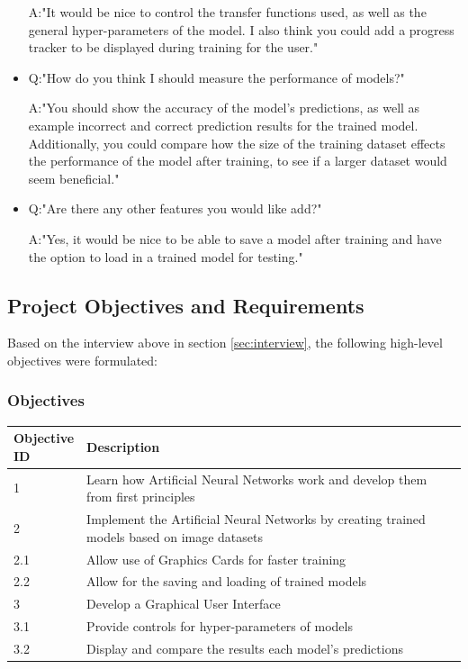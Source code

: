 \documentclass[./project-report/src/latex/project-report.tex]{subfiles}
\begin{document}
\begin{itemize}
          A:"It would be nice to control the transfer functions used, as well as the general hyper-parameters of the model. I also think you could add a progress tracker 
             to be displayed during training for the user."
    \item Q:"How do you think I should measure the performance of models?"

          A:"You should show the accuracy of the model's predictions, as well as example incorrect and correct prediction results for the trained model. Additionally, 
             you could compare how the size of the training dataset effects the performance of the model after training, to see if a larger dataset would seem 
             beneficial."
    \item Q:"Are there any other features you would like add?"

          A:"Yes, it would be nice to be able to save a model after training and have the option to load in a trained model for testing."
\end{itemize}

\subsection{Project Objectives and Requirements}

Based on the interview above in section \ref{sec:interview}, the following high-level objectives were formulated:

\subsubsection{Objectives}

\begin{tabular}{|p{0.13\linewidth}|p{0.87\linewidth}|}
      \hline
      \textbf{Objective ID} & \textbf{Description} \\
      \hline
      1 & Learn how Artificial Neural Networks work and develop them from first principles \\
      \hline
      2 & Implement the Artificial Neural Networks by creating trained models based on image datasets \\
      \hline
      2.1 & Allow use of Graphics Cards for faster training \\
      \hline
      2.2 & Allow for the saving and loading of trained models \\
      \hline
      3 & Develop a Graphical User Interface \\
      \hline
      3.1 & Provide controls for hyper-parameters of models \\
      \hline
      3.2 & Display and compare the results each model's predictions \\
      \hline
\end{tabular}
\end{document}
